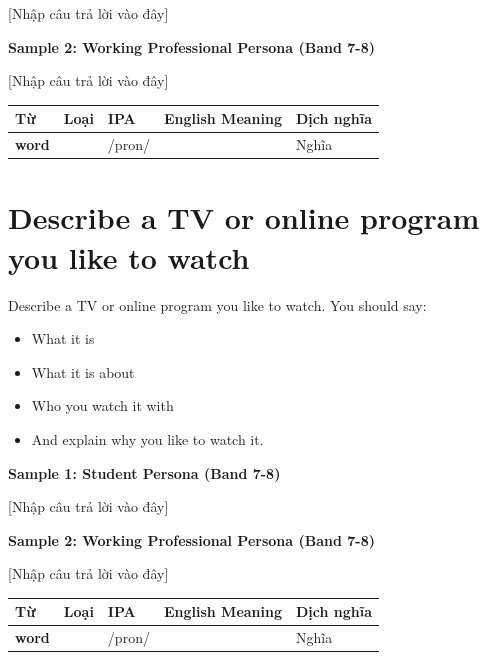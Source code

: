 [Nhập câu trả lời vào đây]

\textbf{Sample 2: Working Professional Persona (Band 7-8)}

[Nhập câu trả lời vào đây]

\separator


\vspace{0.8em}
\begin{center}
\renewcommand{\arraystretch}{1.65}
\begin{tabularx}{\textwidth}{|V{0.22\textwidth}|C{0.07\textwidth}|I{0.20\textwidth}|Y|V{0.18\textwidth}|}
\hline
{}
\textbf{Từ} & \textbf{Loại} & \textbf{IPA} & \textbf{English Meaning} & \textbf{Dịch nghĩa} \\
\hline
\textbf{word} & & /pron/ & & Nghĩa \\ \hline
\end{tabularx}
\end{center}

\newpage

\section{Describe a TV or online program you like to watch}
\begin{ieltsprompt}
Describe a TV or online program you like to watch.
You should say:
\begin{itemize}[leftmargin=2em, itemsep=2pt]
\item What it is
\item What it is about
\item Who you watch it with
\item And explain why you like to watch it.
\end{itemize}
\end{ieltsprompt}
\begin{ieltsanswer}
\textbf{Sample 1: Student Persona (Band 7-8)}

[Nhập câu trả lời vào đây]

\textbf{Sample 2: Working Professional Persona (Band 7-8)}

[Nhập câu trả lời vào đây]
\end{ieltsanswer}


\vspace{0.8em}
\begin{center}
\renewcommand{\arraystretch}{1.65}
\begin{tabularx}{\textwidth}{|V{0.22\textwidth}|C{0.07\textwidth}|I{0.20\textwidth}|Y|V{0.18\textwidth}|}
\hline
{}
\textbf{Từ} & \textbf{Loại} & \textbf{IPA} & \textbf{English Meaning} & \textbf{Dịch nghĩa} \\
\hline
\textbf{word} & & /pron/ & & Nghĩa \\ \hline
\end{tabularx}
\end{center}

